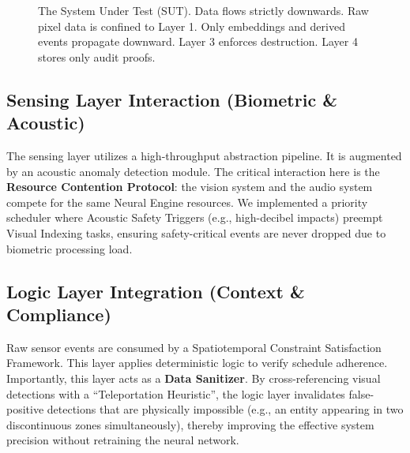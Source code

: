 \documentclass[conference]{IEEEtran}
\begin{document}
\begin{figure}[htbp]
\centering
{}
\caption{The System Under Test (SUT). Data flows strictly downwards. Raw pixel data is confined to Layer 1. Only embeddings and derived events propagate downward. Layer 3 enforces destruction. Layer 4 stores only audit proofs.}
\label{fig:sut_arch}
\end{figure}

\subsection{Sensing Layer Interaction (Biometric \& Acoustic)}
The sensing layer utilizes a high-throughput abstraction pipeline. It is augmented by an acoustic anomaly detection module. The critical interaction here is the \textbf{Resource Contention Protocol}: the vision system and the audio system compete for the same Neural Engine resources. We implemented a priority scheduler where Acoustic Safety Triggers (e.g., high-decibel impacts) preempt Visual Indexing tasks, ensuring safety-critical events are never dropped due to biometric processing load.

\subsection{Logic Layer Integration (Context \& Compliance)}
Raw sensor events are consumed by a Spatiotemporal Constraint Satisfaction Framework. This layer applies deterministic logic to verify schedule adherence. Importantly, this layer acts as a \textbf{Data Sanitizer}. By cross-referencing visual detections with a ``Teleportation Heuristic'', the logic layer invalidates false-positive detections that are physically impossible (e.g., an entity appearing in two discontinuous zones simultaneously), thereby improving the effective system precision without retraining the neural network.
\end{document}
